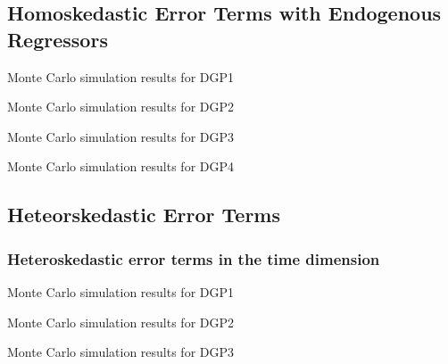 \begin{appendix}
\subsection{Homoskedastic Error Terms with Endogenous Regressors}\label{endo_sim}

\begin{table}[htb]
\caption{Monte Carlo simulation results for \ac{DGP}1}
    \small
    \centering
 
\end{table}
    
\begin{table}[htb]
\caption{Monte Carlo simulation results for \ac{DGP}2}
      \small
    \centering
 
\end{table}


\begin{table}[htb]
\caption{Monte Carlo simulation results for \ac{DGP}3}
      \small
    \centering
 
\end{table}


\begin{table}[htb]
\caption{Monte Carlo simulation results for \ac{DGP}4}
     \small
    \centering
 
\end{table}

\clearpage 


\clearpage

\subsection{Heteorskedastic Error Terms}\label{heter_sim}

\subsubsection{Heteroskedastic error terms in the time dimension}\label{hetero_sim_time}


\begin{table}[htb]
\caption{Monte Carlo simulation results for \ac{DGP}1}
      \small
    \centering
 
\end{table}
    
\begin{table}[htb]
\caption{Monte Carlo simulation results for \ac{DGP}2}
      \small
    \centering
 
\end{table}


\begin{table}[htb]
\caption{Monte Carlo simulation results for \ac{DGP}3}
      \small
    \centering
 
\end{table}



\end{appendix}

